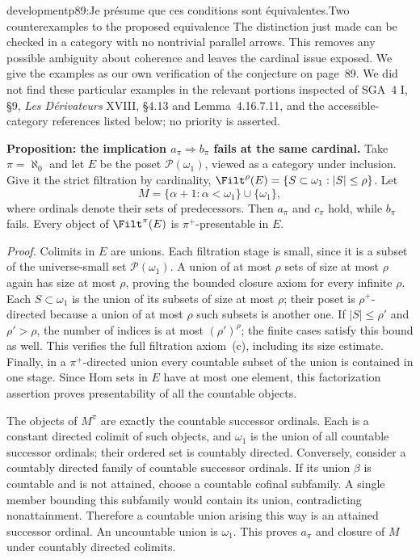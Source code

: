 \begin{dcomment}{development}{p89:Je présume que ces conditions sont équivalentes.}{Two counterexamples to the proposed equivalence}
The distinction just made can be checked in a category with no nontrivial parallel arrows. This removes any possible ambiguity about coherence and leaves the cardinal issue exposed. We give the examples as our own verification of the conjecture on page~89. We did not find these particular examples in the relevant portions inspected of SGA~4 I, \S9, \emph{Les D\'erivateurs} XVIII, \S4.13 and Lemma~4.16.7.11, and the accessible-category references listed below; no priority is asserted.

\textbf{Proposition: the implication $a_\pi\Rightarrow b_\pi$ fails at the same cardinal.}\ours
Take $\pi=\aleph_0$ and let $E$ be the poset $\mathcal P(\omega_1)$, viewed as a category under inclusion. Give it the strict filtration by cardinality, $\Filt^\rho(E)=\{S\subset\omega_1:|S|\leq\rho\}$. Let
\[
 M=\{\alpha+1:\alpha<\omega_1\}\cup\{\omega_1\},
\]
where ordinals denote their sets of predecessors. Then $a_\pi$ and $c_\pi$ hold, while $b_\pi$ fails. Every object of $\Filt^\pi(E)$ is $\pi^+$-presentable in $E$.

\emph{Proof.} Colimits in $E$ are unions. Each filtration stage is small, since it is a subset of the universe-small set $\mathcal P(\omega_1)$. A union of at most $\rho$ sets of size at most $\rho$ again has size at most $\rho$, proving the bounded closure axiom for every infinite $\rho$. Each $S\subset\omega_1$ is the union of its subsets of size at most $\rho$; their poset is $\rho^+$-directed because a union of at most $\rho$ such subsets is another one. If $|S|\leq\rho'$ and $\rho'>\rho$, the number of indices is at most $(\rho')^\rho$; the finite cases satisfy this bound as well. This verifies the full filtration axiom~(c), including its size estimate. Finally, in a $\pi^+$-directed union every countable subset of the union is contained in one stage. Since Hom sets in $E$ have at most one element, this factorization assertion proves presentability of all the countable objects.

The objects of $M^\pi$ are exactly the countable successor ordinals. Each is a constant directed colimit of such objects, and $\omega_1$ is the union of all countable successor ordinals; their ordered set is countably directed. Conversely, consider a countably directed family of countable successor ordinals. If its union $\beta$ is countable and is not attained, choose a countable cofinal subfamily. A single member bounding this subfamily would contain its union, contradicting nonattainment. Therefore a countable union arising this way is an attained successor ordinal. An uncountable union is $\omega_1$. This proves $a_\pi$ and closure of $M$ under countably directed colimits.


\end{dcomment}
